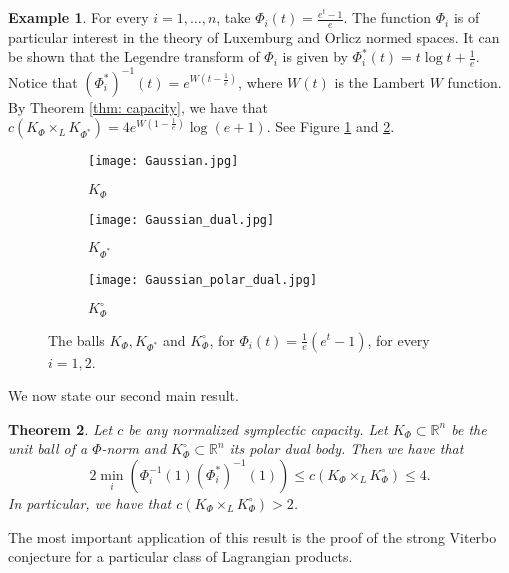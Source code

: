 \documentclass{article}
\newtheorem{theorem}{Theorem}[section]
\theoremstyle{definition}
\newtheorem{example}[theorem]{Example}
\begin{document}
\begin{example}\label{ex: Gaussian}
For every $i=1,\ldots,n$, take $\Phi_i(t)=\frac{e^t-1}{e}$. The function $\Phi_i$ is of particular interest in the theory of Luxemburg and Orlicz normed spaces. It can be shown that the Legendre transform of $\Phi_i$ is given by $\Phi^*_i(t)=t\log t+\frac{1}{e}$. Notice that $(\Phi_i^*)^{-1}(t)=e^{W(t-\frac{1}{e})}$, where $W(t)$ is the Lambert $W$ function. By Theorem \ref{thm: capacity}, we have that  $c(K_{\Phi}\times_L K_{\Phi^*})=4e^{W(1-\frac{1}{e})}\log (e+1)$. See Figure \ref{fig:fig1} and \ref{fig:fig2}. 
\end{example}

\begin{figure}[h]
    \centering
    \begin{subfigure}{0.3\textwidth}
        \centering
        \texttt{[image: Gaussian.jpg]}
        \caption{$K_{\Phi}$}
        \label{fig:fig1}
    \end{subfigure}
    \hfill
    \begin{subfigure}{0.3\textwidth}
        \centering
        \texttt{[image: Gaussian\_dual.jpg]}
        \caption{$K_{\Phi^*}$}
        \label{fig:fig2}
    \end{subfigure}
    \hfill
    \begin{subfigure}{0.3\textwidth}
        \centering
        \texttt{[image: Gaussian\_polar\_dual.jpg]}
        \caption{$K_{\Phi}^{\circ}$}
        \label{fig:fig3}
    \end{subfigure}
    \caption{The balls $K_{\Phi},K_{\Phi^*}$ and $K_{\Phi}^{\circ}$, for $\Phi_i(t)=\frac{1}{e}(e^t-1)$, for every $i=1,2$.}\label{fig: Gaussian_Product}
    
\end{figure}


We now state our second main result.
\begin{theorem}\label{thm: capacity2}
Let $c$ be any normalized symplectic capacity. Let $K_{\Phi}\subset \mathbb{R}^n$ be the unit ball of a $\Phi$-norm and $K_{\Phi}^{\circ}\subset \mathbb{R}^n$ its polar dual body. Then we have that
$$2\min_i(\Phi_i^{-1}(1){(\Phi^*_i)}^{-1}(1))\leq c(K_{\Phi}\times_L K_{\Phi}^{\circ})\leq 4.$$
In particular, we have that $c(K_{\Phi}\times_L K_{\Phi}^{\circ})> 2$.
\end{theorem}
The most important application of this result is the proof of the strong Viterbo conjecture for a particular class of Lagrangian products. 
\end{document}
